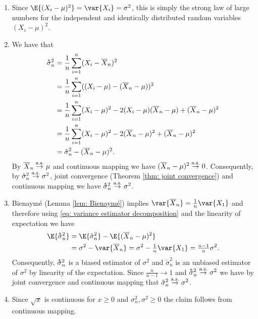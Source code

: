 \begin{solution}
\begin{enumerate}[wide=0pt]
    \item[\ref{it: (var estimation) theoretical}]
    Since \(\E{(X_i-\mu)^2} = \var{X_i} = \sigma^2\), this is
    simply the strong law of large numbers for the independent and identically
    distributed random variables \((X_i-\mu)^2\).

    \item[\ref{it: (var estimation) sample mean}]
    We have that
    \begin{align}
        \nonumber
        \hhat\sigma_n^2
        &= \frac1n\sum_{i=1}^n (X_i-\mean{X}_n)^2
        \\
        \nonumber
        &= \frac1n\sum_{i=1}^n ((X_i-\mu) - (\mean{X}_n - \mu))^2
        \\
        \nonumber
        &= \frac1n\sum_{i=1}^n (X_i-\mu)^2 - 2(X_i-\mu)(\mean{X}_n - \mu) + (\mean{X}_n - \mu)^2
        \\
        \nonumber
        &= \frac1n\sum_{i=1}^n (X_i-\mu)^2 - 2(\mean{X}_n - \mu)^2 + (\mean{X}_n - \mu)^2
        \\
        \label{eq: variance estimator decomposition}
        &= \hat\sigma_n^2 - (\mean{X}_n - \mu)^2.
    \end{align}
    By \(\overline{X}_n \overset{\operatorname{\text{a.s.}}}\to \mu\) and continuous mapping
    we have \((\overline{X}_n - \mu)^2 \overset{\operatorname{\text{a.s.}}}\to 0\). Consequently,
    by \(\hat\sigma_n^2 \overset{\operatorname{\text{a.s.}}}\to \sigma^2\), joint convergence
    (Theorem \ref{thm: joint convergence}) and continuous mapping we have
    \(\hhat\sigma_n^2 \overset{\as}\to \sigma^2\).

    \item[\ref{it: (var estimation) bias and consistency}]
    Bienaymé (Lemma \ref{lem: Bienaymé}) implies \(\var{\mean{X}_n} =
    \frac1n \var{X_1}\) and therefore using \eqref{eq: variance estimator decomposition}
    and the linearity of expectation we have
    \begin{align*}
        \E{\hhat\sigma_n^2}
        &= \E{\hat\sigma_n^2} - \E{(\mean{X}_n - \mu)^2}
        \\
        &= \sigma^2 - \var{\mean{X}_n}
        = \sigma^2 - \tfrac1n\var{X_1} = \tfrac{n-1}{n}\sigma^2.
    \end{align*}
    Consequently, \(\hhat\sigma_n^2\) is a biased estimator of
    \(\sigma^2\) and \(\tilde\sigma_n^2\) is an unbiased estimator of
    \(\sigma^2\) by linearity of the expectation.
    Since \(\frac{n}{n-1} \to 1\) and \(\hhat\sigma_n^2 \overset{\as}\to
    \sigma^2\) we have by joint convergence and continuous mapping that
    \(\tilde\sigma_n^2 \overset{\operatorname{\text{a.s.}}}\to \sigma^2\).

    \item[\ref{it: (var estimation) standard deviation}]
    Since \(\sqrt{x}\) is continuous for \(x \ge 0\) and \(\sigma_n^2,
    \sigma^2 \ge 0\) the claim follows from continuous mapping.
    \qedhere
\end{enumerate}
\end{solution}

